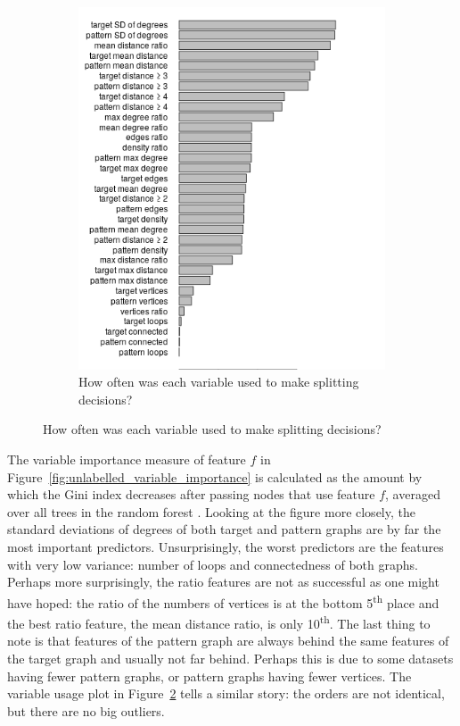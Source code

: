\documentclass{l4proj}
\theoremstyle{definition}
\theoremstyle{remark}
\begin{document}
\begin{figure}
\begin{subfigure}[t]{0.45\textwidth}
    \includegraphics[width=\textwidth]{images/unlabelled_var_used.png}
    \caption{How often was each variable used to make splitting decisions?}
    \label{fig:unlabelled_var_used}
  \end{subfigure}
\end{figure}

The variable importance measure of feature $f$ in
Figure~\ref{fig:unlabelled_variable_importance} is calculated as the amount by
which the Gini index decreases after passing nodes that use feature $f$,
averaged over all trees in the random forest \cite{James:2014:ISL:2517747}.
Looking at the figure more closely, the standard deviations of degrees of both
target and pattern graphs are by far the most important predictors.
Unsurprisingly, the worst predictors are the features with very low variance:
number of loops and connectedness of both graphs. Perhaps more surprisingly, the
ratio features are not as successful as one might have hoped: the ratio of the
numbers of vertices is at the bottom 5\textsuperscript{th} place and the best
ratio feature, the mean distance ratio, is only 10\textsuperscript{th}. The last
thing to note is that features of the pattern graph are always behind the same
features of the target graph and usually not far behind. Perhaps this is due to
some datasets having fewer pattern graphs, or pattern graphs having fewer
vertices. The variable usage plot in Figure~\ref{fig:unlabelled_var_used} tells
a similar story: the orders are not identical, but there are no big outliers.
\end{document}
